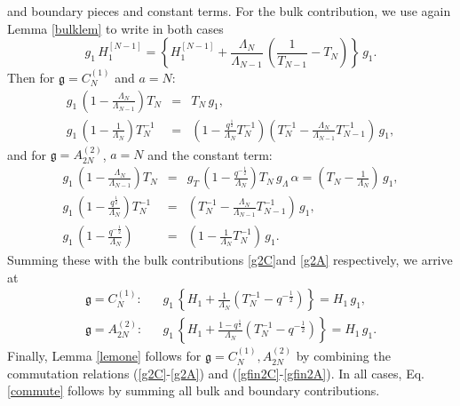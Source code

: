 \documentclass[12pt]{amsart}
\newcommand{\g}{{\mathfrak{g}}}
\newcommand{\al}{{\alpha}}
\newcommand{\lL}{{\Lambda}}
\numberwithin{equation}{section}
\begin{document}
and boundary pieces and constant terms. For the bulk contribution, we use again Lemma \ref{bulklem} to write in both cases
\begin{equation}
\label{bulk2CA}
g_1\,  H_1^{[N-1]}= \left\{ H_1^{[N-1]} +\frac{\lL_{N}}{\lL_{N-1}}\,\left(\frac{1}{T_{N-1}}- T_{N}\right)\right\}\, g_1.
\end{equation}
Then for $\g=C_N^{(1)}$ and $a=N$:
\begin{eqnarray*}
g_{1}\, \left(1-\frac{\Lambda_{N}}{\Lambda_{N-1}}\right) T_N&=&
T_N\, g_{1},\\
g_{1}\, \left(1-\frac{1}{\Lambda_{N}}\right) T_N^{-1}&=& \left(1-\frac{q^\frac{1}{2}}{\Lambda_{N}}T_N^{-1}\right) \left(T_N^{-1}-\frac{\Lambda_{N}}{\Lambda_{N-1}}T_{N-1}^{-1}\right)\, g_{1},
\end{eqnarray*}
and for $\g=A_{2N}^{(2)}$, $a=N$ and the constant term:
\begin{eqnarray*}
g_1\, \left( 1- \frac{\lL_N}{\lL_{N-1}}\right)T_N&=&g_T\,\left(1- \frac{q^{-\frac{1}{2}}}{\lL_N}\right)T_N\, g_\lL\,\al
=\left(T_N-\frac{1}{\lL_N}\right)\, g_1,\\
g_1\, \left( 1- \frac{q^\frac{1}{2}}{\lL_N}\right)T_N^{-1}&=&\left(T_N^{-1}-\frac{\lL_N}{\lL_{N-1}}T_{N-1}^{-1}\right)\, g_1,\\
g_1\, \left( 1- \frac{q^{-\frac{1}{2}}}{\lL_N}\right) &=&\left(1- \frac{1}{\lL_N}T_N^{-1}\right)\, g_1.
\end{eqnarray*}
Summing these with the bulk contributions \eqref{g2C}and \eqref{g2A} respectively, we arrive at
\begin{eqnarray}
\g=C_N^{(1)}: && g_1 \,\left\{ H_1+ \frac{1}{\lL_N}(T_N^{-1}-q^{-\frac{1}{2}})\right\}=H_1\, g_1,\label{gfin2C}\\
\g=A_{2N}^{(2)}:&& g_1\,\left\{ H_1+ \frac{1-q^{\frac{1}{2}}}{\lL_N}(T_N^{-1}-q^{-\frac{1}{2}})\right\}=H_1\, g_1.\label{gfin2A}
\end{eqnarray}
Finally, Lemma \ref{lemone} follows for $\g=C_N^{(1)},A_{2N}^{(2)}$ by combining the commutation relations 
(\ref{g2C}-\ref{g2A}) and (\ref{gfin2C}-\ref{gfin2A}). In all cases, Eq. \eqref{commute} follows by summing all bulk and boundary contributions.


\end{document}

